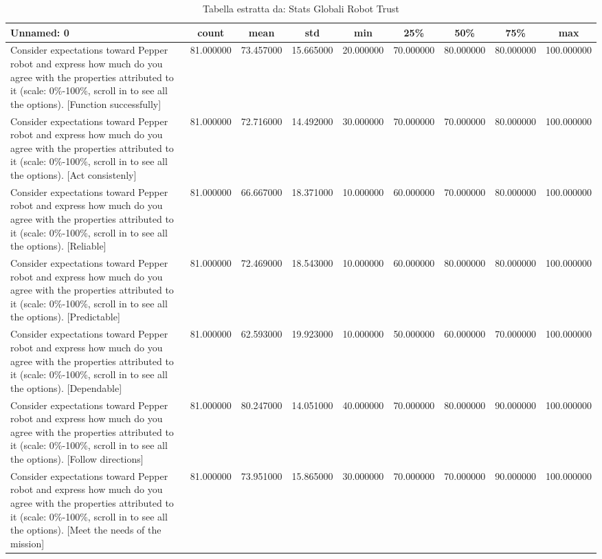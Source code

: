 \begin{table}[htbp]
\caption{Tabella estratta da: Stats Globali Robot Trust}
\label{tab:stats_globali_robot_trust}
\begin{tabular}{lcccccccc}
\toprule
Unnamed: 0 & count & mean & std & min & 25\% & 50\% & 75\% & max \\
\midrule
Consider expectations toward Pepper robot and express how much do you agree with the properties attributed to it (scale: 0\%-100\%, scroll in to see all the options).  [Function successfully] & 81.000000 & 73.457000 & 15.665000 & 20.000000 & 70.000000 & 80.000000 & 80.000000 & 100.000000 \\
Consider expectations toward Pepper robot and express how much do you agree with the properties attributed to it (scale: 0\%-100\%, scroll in to see all the options).  [Act consistenly] & 81.000000 & 72.716000 & 14.492000 & 30.000000 & 70.000000 & 70.000000 & 80.000000 & 100.000000 \\
Consider expectations toward Pepper robot and express how much do you agree with the properties attributed to it (scale: 0\%-100\%, scroll in to see all the options).  [Reliable] & 81.000000 & 66.667000 & 18.371000 & 10.000000 & 60.000000 & 70.000000 & 80.000000 & 100.000000 \\
Consider expectations toward Pepper robot and express how much do you agree with the properties attributed to it (scale: 0\%-100\%, scroll in to see all the options).  [Predictable] & 81.000000 & 72.469000 & 18.543000 & 10.000000 & 60.000000 & 80.000000 & 80.000000 & 100.000000 \\
Consider expectations toward Pepper robot and express how much do you agree with the properties attributed to it (scale: 0\%-100\%, scroll in to see all the options).  [Dependable] & 81.000000 & 62.593000 & 19.923000 & 10.000000 & 50.000000 & 60.000000 & 70.000000 & 100.000000 \\
Consider expectations toward Pepper robot and express how much do you agree with the properties attributed to it (scale: 0\%-100\%, scroll in to see all the options).  [Follow directions] & 81.000000 & 80.247000 & 14.051000 & 40.000000 & 70.000000 & 80.000000 & 90.000000 & 100.000000 \\
Consider expectations toward Pepper robot and express how much do you agree with the properties attributed to it (scale: 0\%-100\%, scroll in to see all the options).  [Meet the needs of the mission] & 81.000000 & 73.951000 & 15.865000 & 30.000000 & 70.000000 & 70.000000 & 90.000000 & 100.000000 \\

\end{tabular}
\end{table}
